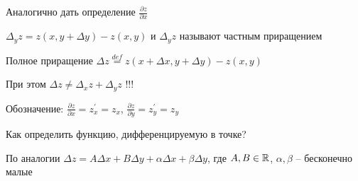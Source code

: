 \documentclass[12pt]{article}
\begin{document}
    \Lab Аналогично дать определение $\displaystyle \frac{\partial z}{\partial x}$

    \Nota $\Delta_y z = z(x, y + \Delta y) - z(x, y)$ и  $\Delta_y z$ называют частным приращением

    \Def Полное приращение $\Delta z \stackrel{def}{=} z(x + \Delta x, y + \Delta y) - z(x, y)$

    \Notas При этом $\Delta z \neq \Delta_x z + \Delta_y z$ !!!

    Обозначение: $\displaystyle \frac{\partial z}{\partial x} = z^\prime_x = z_x$, $\displaystyle \frac{\partial z}{\partial y} = z^\prime_y = z_y$

    Как определить функцию, дифференцируемую в точке?

    По аналогии $\Delta z = A \Delta x + B \Delta y + \alpha \Delta x + \beta \Delta y$, где $A, B \in \mathbb{R}$, $\alpha, \beta$ -- бесконечно малые
\end{document}
